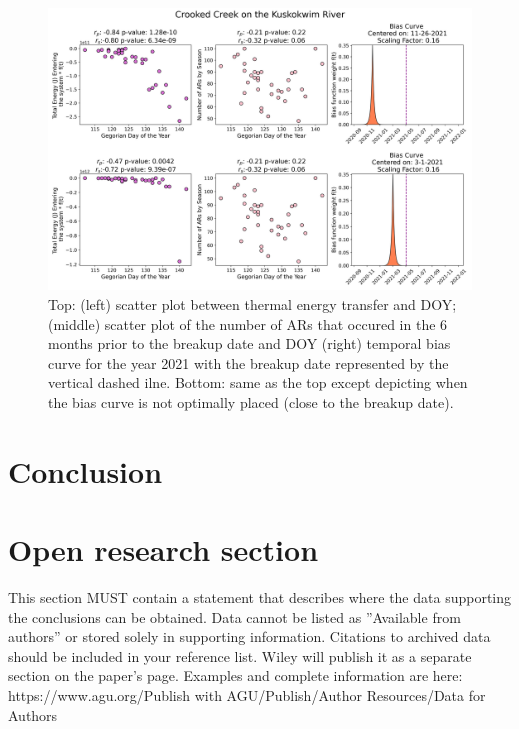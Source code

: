 \documentclass[draft]{AR_analysis_}
\begin{document}
\begin{figure}
\centering
\includegraphics[width=1.0\textwidth]{./images/concatenated_corr_plots.png}
	\caption{Top: (left) scatter plot between thermal energy
	transfer and DOY; (middle) scatter plot of the number of ARs
	that occured in the 6 months prior to the breakup date and DOY 
	(right) temporal bias curve for the year 2021 with the breakup
	date represented by the vertical dashed ilne. Bottom: same as
	the top except depicting when the bias curve is not optimally
	placed (close to the breakup date).}
\label{fig:concatenated_corr_plots}
\end{figure}

\section{Conclusion}


%
%

\section*{Open research section}
This section MUST contain a statement that describes where the data supporting the conclusions
can be obtained. Data cannot be listed as ''Available from authors'' or stored solely in 
supporting information. Citations to archived data should be included in your reference
list. Wiley will publish it as a separate section on the paper’s page. Examples and 
complete information are here:
https://www.agu.org/Publish with AGU/Publish/Author Resources/Data for Authors
\end{document}
